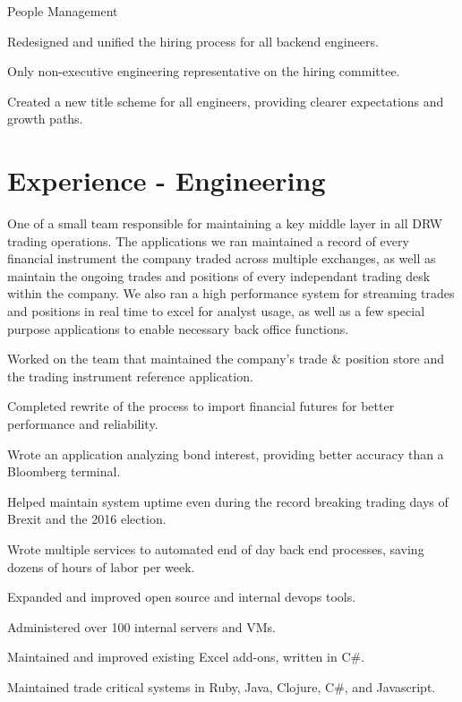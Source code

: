\documentclass[]{deedy-resume-openfont}
\begin{document}
\sectionsep
People Management
\begin{tightemize}
  \item Redesigned and unified the hiring process for all backend engineers.
  \item Only non-executive engineering representative on the hiring committee.
  \item Created a new title scheme for all engineers, providing clearer expectations and growth paths.
\end{tightemize}

\pagebreak

\section{Experience - Engineering}

\vspace{\topsep}
One of a small team responsible for maintaining a key middle layer in all DRW trading operations. The applications we ran maintained a record of every financial instrument the company traded across multiple exchanges, as well as maintain the ongoing trades and positions of every independant trading desk within the company. We also ran a high performance system for streaming trades and positions in real time to excel for analyst usage, as well as a few special purpose applications to enable necessary back office functions.
\vspace{\topsep}
\begin{tightemize}
\item Worked on the team that maintained the company's trade \& position store and the trading instrument reference application.
\item Completed rewrite of the process to import financial futures for better performance and reliability.
\item Wrote an application analyzing bond interest, providing better accuracy than a Bloomberg terminal.
\item Helped maintain system uptime even during the record breaking trading days of Brexit and the 2016 election.
\item Wrote multiple services to automated end of day back end processes, saving dozens of hours of labor per week.
\item Expanded and improved open source and internal devops tools.
\item Administered over 100 internal servers and VMs.
\item Maintained and improved existing Excel add-ons, written in C\#.
\item Maintained trade critical systems in Ruby, Java, Clojure, C\#, and Javascript.
\end{tightemize}
\sectionsep
\end{document}
